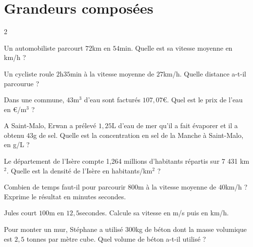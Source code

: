 \documentclass[a4paper,10pt]{report}
\begin{document}
\pagestyle{empty}
\newpage
\section*{Grandeurs composées}

\footnotesize
\setlength{\columnsep}{7mm}
\setlength{\parskip}{0pt}
\begin{multicols}{2}

\vspace{-4mm}
\begin{ex}
Un automobiliste parcourt $72$km en $54$min. Quelle est sa vitesse moyenne en km/h ?
\end{ex}

\begin{ex}
Un cycliste roule $2$h$35$min à la vitesse moyenne de $27$km/h. Quelle distance a-t-il parcourue ?
\end{ex}

\begin{ex}
Dans une commune, $43$m$^3$ d'eau sont facturés $107,07$\euro. Quel est le prix de l'eau en \euro /m$^3$ ?
\end{ex}

\begin{ex}
A Saint-Malo, Erwan a prélevé $1,25$L d'eau de mer qu'il a fait évaporer et il a obtenu $43$g de sel. Quelle est la concentration en sel de la Manche à Saint-Malo, en g/L ?
\end{ex}

\begin{ex}
Le département de l'Isère compte 1,264 millions d'habitants répartis sur 7 431 km$^2$. Quelle est la densité de l'Isère en habitants/km$^2$ ?
\end{ex}

\begin{ex}
Combien de temps faut-il pour parcourir $800$m à la vitesse moyenne de $40$km/h ? Exprime le résultat en minutes secondes.
\end{ex}

\begin{ex}
Jules court $100$m en $12,5$secondes. Calcule sa vitesse en m/s puis en km/h.
\end{ex}

\begin{ex}
Pour monter un mur, Stéphane a utilisé $300$kg de béton dont la masse volumique est $2,5$ tonnes par mètre cube. Quel volume de béton a-t-il utilisé ?
\end{ex}


\end{multicols}
\end{document}
